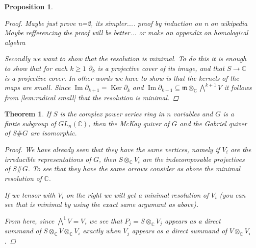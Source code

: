 \documentclass[11pt, a4paper, english]{article}
\newtheorem{prop}{Proposition}
\numberwithin{prop}{section}
\numberwithin{lemma}{section}
\newtheorem{theorem}{Theorem}
\numberwithin{theorem}{section}
\numberwithin{defin}{section}
\numberwithin{example}{section}
\newcommand{\C}{\mathbb{C}}
\DeclareMathOperator{\Image}{Im}
\DeclareMathOperator{\Ker}{Ker}
\begin{document}
\begin{prop}
\begin{proof}
Maybe just prove n=2, its simpler....
proof by induction on n on wikipedia %
{\color{red}Maybe refferencing the proof will be better... or make an appendix on homological algebra}
\fi

Secondly we want to show that the resolution is minimal. To do this it is enough to show that for each $k \geq 1$ $\partial_k$ is a projective cover of its image, and that $S \to \C$ is a projective cover. In other words we have to show is that the kernels of the maps are small. Since $\Image \partial_{k+1} = \Ker \partial_k$ and $\Image \partial_{k+1} \subseteq \mathfrak{m} \otimes_\C \bigwedge\limits^{k+1}V$ it follows from \cref{lem:radical small} that the resolution is minimal.
\end{proof}
\end{prop}

\begin{theorem}
If $S$ is the complex power series ring in $n$ variables and $G$ is a fintie subgroup of $GL_n(\C)$, then the McKay quiver of $G$ and the Gabriel quiver of $S\#G$ are isomorphic.
\begin{proof}
We have already seen that they have the same vertices, namely if $V_i$ are the irreducible representations of $G$, then $S \otimes_\C V_i$ are the indecomposable projectives of $S\#G$. To see that they have the same arrows consider as above the minimal resolution of $\C$.
\begin{center}
\end{center}
If we tensor with $V_i$ on the right we will get a minimal resolution of $V_i$ (you can see that is minimal by using the exact same argumant as above).
\begin{center}
\end{center}
From here, since $\bigwedge\limits^{1} V = V$, we see that $P_j = S \otimes_\C V_j$ appears as a direct summand of $S \otimes_\C V \otimes_\C V_i$ exactly when $V_j$ appears as a direct summand of $V \otimes_\C V_i$.
\end{proof}
\end{theorem}
\end{document}
